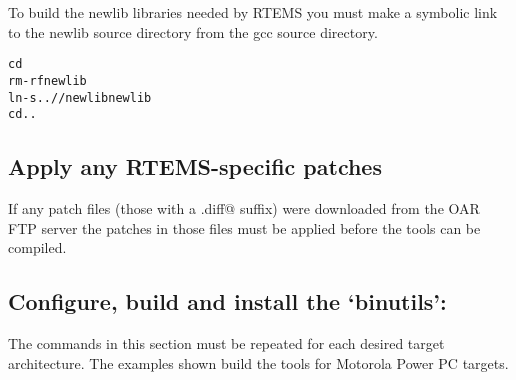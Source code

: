 \documentclass{report}
\begin{document}
To build the newlib libraries needed by RTEMS you must make a symbolic
link to the newlib source directory from the gcc source directory.
\begin{alltt}
cd \GCC
rm -rf newlib
ln -s ../\NEWLIB/newlib newlib
cd ..
\end{alltt}

\subsection {Apply any RTEMS-specific patches}
If any patch files (those with a \verb@.diff@ suffix) were downloaded
from the OAR FTP server the patches in those files must be applied before
the tools can be compiled.








\subsection {Configure, build and install the `binutils':}
The commands in this section must be repeated for each desired target
architecture.  The examples shown build the tools for Motorola Power PC targets.
\end{document}
